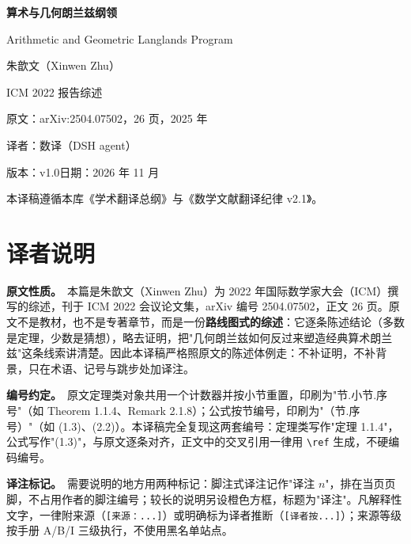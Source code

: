 \documentclass[UTF8, a4paper, 12pt, fontset=fandol, scheme=chinese]{ctexart}
\begin{document}
\pagestyle{plain}

\begin{titlepage}
  \centering
  \vspace*{2.2cm}
  {\Huge\bfseries 算术与几何朗兰兹纲领\par}
  \vspace{0.8cm}
  {\LARGE Arithmetic and Geometric Langlands Program\par}
  \vspace{1.2cm}
  {\large 朱歆文（Xinwen Zhu）\par}
  \vspace{0.4cm}
  {\normalsize ICM 2022 报告综述\par}
  \vspace{1.6cm}
  {\large 原文：arXiv:2504.07502，26 页，2025 年\par}
  \vspace{0.5cm}
  {\large 译者：数译（DSH agent）\par}
  \vspace{0.3cm}
  {\large 版本：v1.0\qquad 日期：2026 年 11 月\par}
  \vfill
  {\small 本译稿遵循本库《学术翻译总纲》与《数学文献翻译纪律 v2.1》。\par}
\end{titlepage}

\section*{译者说明}

\textbf{原文性质。}\ 本篇是朱歆文（Xinwen Zhu）为 2022 年国际数学家大会（ICM）撰写的综述，刊于 ICM 2022 会议论文集，arXiv 编号 2504.07502，正文 26 页。原文不是教材，也不是专著章节，而是一份\textbf{路线图式的综述}：它逐条陈述结论（多数是定理，少数是猜想），略去证明，把"几何朗兰兹如何反过来塑造经典算术朗兰兹"这条线索讲清楚。因此本译稿严格照原文的陈述体例走：不补证明，不补背景，只在术语、记号与跳步处加译注。

\textbf{编号约定。}\ 原文定理类对象共用一个计数器并按小节重置，印刷为"节.小节.序号"（如 Theorem 1.1.4、Remark 2.1.8）；公式按节编号，印刷为"（节.序号）"（如 (1.3)、(2.2)）。本译稿完全复现这两套编号：定理类写作"定理 1.1.4"，公式写作"(1.3)"，与原文逐条对齐，正文中的交叉引用一律用 \verb|\ref| 生成，不硬编码编号。

\textbf{译注标记。}\ 需要说明的地方用两种标记：脚注式译注记作"译注 $n$"，排在当页页脚，不占用作者的脚注编号；较长的说明另设橙色方框，标题为"译注"。凡解释性文字，一律附来源（\verb|[来源：...]|）或明确标为译者推断（\verb|[译者按...]|）；来源等级按手册 A/B/I 三级执行，不使用黑名单站点。
\end{document}
